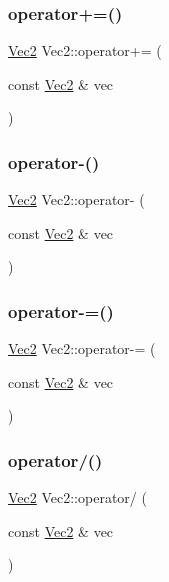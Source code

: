 \mbox{\label{struct_vec2_afa88ae0d88c6bd092ca1592a06b1be04}} 
\subsubsection{\texorpdfstring{operator+=()}{operator+=()}}
{\footnotesize\ttfamily \mbox{\hyperlink{struct_vec2}{Vec2}} Vec2\+::operator+= (\begin{DoxyParamCaption}\item[{const \mbox{\hyperlink{struct_vec2}{Vec2}} \&}]{vec }\end{DoxyParamCaption})}

\mbox{\label{struct_vec2_ab41b66fe339aae8150829626682c355e}} 
\subsubsection{\texorpdfstring{operator-\/()}{operator-()}}
{\footnotesize\ttfamily \mbox{\hyperlink{struct_vec2}{Vec2}} Vec2\+::operator-\/ (\begin{DoxyParamCaption}\item[{const \mbox{\hyperlink{struct_vec2}{Vec2}} \&}]{vec }\end{DoxyParamCaption})}

\mbox{\label{struct_vec2_a019231f7b97a2fb52c67487088fa2022}} 
\subsubsection{\texorpdfstring{operator-\/=()}{operator-=()}}
{\footnotesize\ttfamily \mbox{\hyperlink{struct_vec2}{Vec2}} Vec2\+::operator-\/= (\begin{DoxyParamCaption}\item[{const \mbox{\hyperlink{struct_vec2}{Vec2}} \&}]{vec }\end{DoxyParamCaption})}

\mbox{\label{struct_vec2_a702c5b3a06645680a94cd1929eaddca8}} 
\subsubsection{\texorpdfstring{operator/()}{operator/()}}
{\footnotesize\ttfamily \mbox{\hyperlink{struct_vec2}{Vec2}} Vec2\+::operator/ (\begin{DoxyParamCaption}\item[{const \mbox{\hyperlink{struct_vec2}{Vec2}} \&}]{vec }\end{DoxyParamCaption})}

